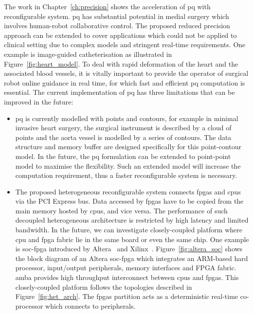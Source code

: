The work in Chapter~\ref{ch:precision} shows the acceleration of \gls{pq} with reconfigurable system.
\gls{pq} has substantial potential in medial surgery which involves human-robot collaborative control.
The proposed reduced precision approach can be extended to cover applications which could not be applied to clinical setting due to complex models and stringent real-time requirements.
One example is image-guided catheterisation as illustrated in Figure~\ref{fig:heart_model}.
To deal with rapid deformation of the heart and the associated blood vessels, it is vitally important to provide the operator of surgical robot online guidance in real time, for which fast and efficient \gls{pq} computation is essential.
The current implementation of \gls{pq} has three limitations that can be improved in the future:
\begin{itemize}
\item \gls{pq} is currently modelled with points and contours, for example in minimal invasive heart surgery, the surgical instrument is described by a cloud of points and the aorta vessel is modelled by a series of contours.
The data structure and memory buffer are designed specifically for this point-contour model. %
In the future, the \gls{pq} formulation can be extended to point-point model to maximise the flexibility.
Such an extended model will increase the computation requirement, thus a faster reconfigurable system is necessary.
\item The proposed heterogeneous reconfigurable system connects \glspl{fpga} and \glspl{cpu} via the PCI Express bus.
Data accessed by \glspl{fpga} have to be copied from the main memory hosted by \glspl{cpu}, and vice versa.
The performance of such decoupled heterogeneous architecture is restricted by high latency and limited bandwidth.
In the future, we can investigate closely-coupled platform where \gls{cpu} and \gls{fpga} fabric lie in the same board or even the same chip.
One example is \gls{soc}-\gls{fpga} introduced by Altera~\cite{alterasoc} and Xilinx~\cite{xilinxzynq}.
Figure~\ref{fig:altera_soc} shows the block diagram of an Altera \gls{soc}-\gls{fpga} which integrates an ARM-based hard processor, input/output peripherals, memory interfaces and FPGA fabric.
\gls{amba} provides high throughput interconnect between \glspl{cpu} and \glspl{fpga}.
This closely-coupled platform follows the topologies described in Figure~\ref{fig:het_arch}.
The \glspl{fpga} partition acts as a deterministic real-time co-processor which connects to peripherals.

\end{itemize}
